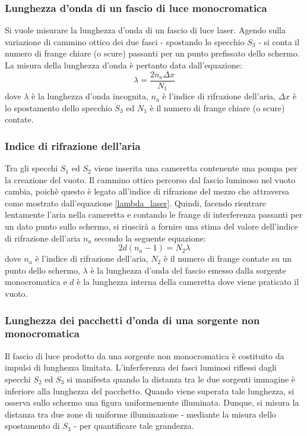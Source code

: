 \documentclass[]{article}
\begin{document}
\subsubsection{Lunghezza d'onda di un fascio di luce monocromatica}

Si vuole misurare la lunghezza d'onda di un fascio di luce laser. Agendo sulla variazione di cammino ottico dei due fasci - spostando lo specchio $S_3$ - si conta il numero di frange chiare (o scure) passanti per un punto prefissato dello schermo. La misura della lunghezza d'onda è pertanto data dall'equazione:
\begin{equation}
    \label{lambda_laser}
    \lambda = \frac{2 n_a \Delta x}{N_1}
\end{equation}
dove $\lambda$ è la lunghezza d'onda incognita, $n_a$ è l'indice di rifrazione dell'aria, $\Delta x$ è lo spostamento dello specchio $S_3$ ed $N_1$ è il numero di frange chiare (o scure) contate.

\subsubsection{Indice di rifrazione dell'aria}

Tra gli specchi $S_1$ ed $S_2$ viene inserita una cameretta contenente una pompa per la creazione del vuoto. Il cammino ottico percorso dal fascio luminoso nel vuoto cambia, poichè questo è legato all'indice di rifrazione del mezzo che attraversa come mostrato dall'equazione \ref{lambda_laser}. Quindi, facendo rientrare lentamente l'aria nella cameretta e contando le frange di interferenza passanti per un dato punto sullo schermo, si riuscirà a fornire una stima del valore dell'indice di rifrazione dell'aria $n_a$ secondo la seguente equazione:
\begin{equation}
    \label{n_a}
    2d(n_a - 1) = N_2 \lambda
\end{equation}
dove $n_a$ è l'indice di rifrazione dell'aria, $N_2$ è il numero di frange contate su un punto dello schermo, $\lambda$ è la lunghezza d'onda del fascio emesso dalla sorgente monocromatica e $d$ è la lunghezza interna della cameretta dove viene praticato il vuoto.

\subsubsection{Lunghezza dei pacchetti d'onda di una sorgente non monocromatica}
\label{par:123}

Il fascio di luce prodotto da una sorgente non monocromatica è costituito da impulsi di lunghezza limitata. L'inferferenza dei fasci luminosi riflessi dagli specchi $S_2$ ed $S_3$ si manifesta quando la distanza tra le due sorgenti immagine è inferiore alla lunghezza del pacchetto. Quando viene superata tale lunghezza, si osserva sullo schermo una figura uniformemente illuminata. Dunque, si misura la distanza tra due zone di uniforme illuminazione - mediante la misura dello spostamento di $S_3$ - per quantificare tale grandezza.
\end{document}
